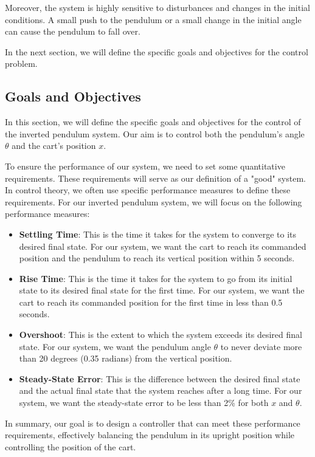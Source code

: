 \documentclass[11pt,twocolumn,twoside,lineno]{pnas-new}
\begin{document}
Moreover, the system is highly sensitive to disturbances and changes in the initial conditions. A small push to the pendulum or a small change in the initial angle can cause the pendulum to fall over. 

In the next section, we will define the specific goals and objectives for the control problem.

\subsection{Goals and Objectives}
In this section, we will define the specific goals and objectives for the control of the inverted pendulum system. Our aim is to control both the pendulum's angle $\theta$ and the cart's position $x$.

To ensure the performance of our system, we need to set some quantitative requirements. These requirements will serve as our definition of a "good" system. In control theory, we often use specific performance measures to define these requirements. For our inverted pendulum system, we will focus on the following performance measures:

\begin{itemize}
    \item \textbf{Settling Time}: This is the time it takes for the system to converge to its desired final state. For our system, we want the cart to reach its commanded position and the pendulum to reach its vertical position within 5 seconds.
    \item \textbf{Rise Time}: This is the time it takes for the system to go from its initial state to its desired final state for the first time. For our system, we want the cart to reach its commanded position for the first time in less than 0.5 seconds.
    \item \textbf{Overshoot}: This is the extent to which the system exceeds its desired final state. For our system, we want the pendulum angle $\theta$ to never deviate more than 20 degrees (0.35 radians) from the vertical position.
    \item \textbf{Steady-State Error}: This is the difference between the desired final state and the actual final state that the system reaches after a long time. For our system, we want the steady-state error to be less than 2\% for both $x$ and $\theta$.
\end{itemize}

In summary, our goal is to design a controller that can meet these performance requirements, effectively balancing the pendulum in its upright position while controlling the position of the cart.
\end{document}
